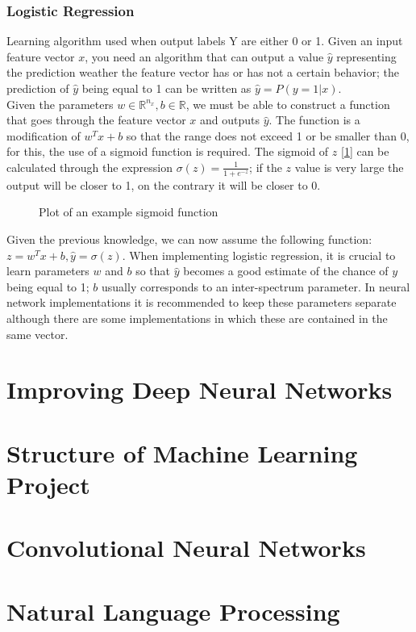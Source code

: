 \documentclass[11pt]{report}
\begin{document}
\subsection*{Logistic Regression}
Learning algorithm used when output labels Y are either 0 or 1. Given an input feature vector $x$, you need an algorithm that can output a value $\hat{y}$ representing the prediction weather the feature vector has or has not a certain behavior; the prediction of $\hat{y}$ being equal to 1 can be written as $\hat{y} = P(y=1|x)$.\\
Given the parameters $w \in \mathbb{R}^{n_x}, b \in \mathbb{R}$, we must be able to construct a function that goes through the feature vector $x$ and outputs $\hat{y}$. The function is a modification of $w^Tx + b$ so that the range does not exceed 1 or be smaller than 0, for this, the use of a sigmoid function is required. The sigmoid of $z$ [\ref{fig:F2}] can be calculated through the expression $\sigma(z)=\frac{1}{1+e^{-z}}$; if the $z$ value is very large the output will be closer to 1, on the contrary it will be closer to 0.
\begin{figure}
	\centering
	\caption{Plot of an example sigmoid function} \label{fig:F2}
\end{figure}
Given the previous knowledge, we can now assume the following function:$z = w^Tx + b, \hat{y} = \sigma(z)$. When implementing logistic regression, it is crucial to learn parameters $w$ and $b$ so that $\hat{y}$ becomes a good estimate of the chance of $y$ being equal to 1; $b$ usually corresponds to an inter-spectrum parameter. In neural network implementations it is recommended to keep these parameters separate although there are some implementations in which these are contained in the same vector.
\newpage


\chapter{Improving Deep Neural Networks}

\chapter{Structure of Machine Learning Project}

\chapter{Convolutional Neural Networks}

\chapter{Natural Language Processing}


\end{document}
